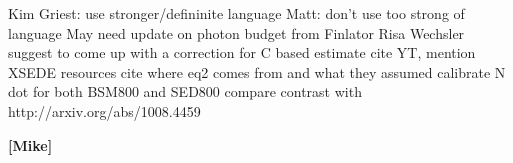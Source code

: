 Kim Griest: use stronger/defininite language
Matt: don't use too strong of language
May need update on photon budget from Finlator
Risa Wechsler suggest to come up with a correction for C based estimate
cite YT, mention XSEDE resources
cite where eq2 comes from and what they assumed
calibrate N dot for both BSM800 and SED800
compare contrast with http://arxiv.org/abs/1008.4459

{\bf [Mike]}

